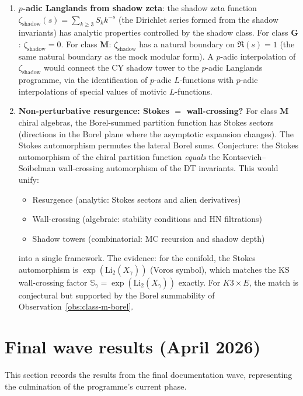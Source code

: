 \documentclass[11pt]{article}
\begin{document}
\begin{enumerate}[label=\textup{(\arabic*)}]
 \item \textbf{$p$-adic Langlands from shadow zeta}: the shadow
 zeta function $\zeta_{\mathrm{shadow}}(s) = \sum_{k \geq 3} S_k k^{-s}$
 (the Dirichlet series formed from the shadow invariants) has
 analytic properties controlled by the shadow class. For class
 $\mathbf{G}$: $\zeta_{\mathrm{shadow}} = 0$. For class $\mathbf{M}$:
 $\zeta_{\mathrm{shadow}}$ has a natural boundary on $\Re(s) = 1$
 (the same natural boundary as the mock modular form).
 A $p$-adic interpolation of $\zeta_{\mathrm{shadow}}$ would connect
 the CY shadow tower to the $p$-adic Langlands programme, via the
 identification of $p$-adic $L$-functions with $p$-adic interpolations
 of special values of motivic $L$-functions.

 \item \textbf{Non-perturbative resurgence: Stokes $=$ wall-crossing?}
 For class $\mathbf{M}$ chiral algebras, the Borel-summed partition
 function has Stokes sectors (directions in the Borel plane where the
 asymptotic expansion changes). The Stokes automorphism permutes the
 lateral Borel sums. Conjecture: the Stokes automorphism of the chiral
 partition function \emph{equals} the Kontsevich--Soibelman
 wall-crossing automorphism of the DT invariants. This would unify:
 \begin{itemize}
  \item Resurgence (analytic: Stokes sectors and alien derivatives)
  \item Wall-crossing (algebraic: stability conditions and HN filtrations)
  \item Shadow towers (combinatorial: MC recursion and shadow depth)
 \end{itemize}
 into a single framework. The evidence: for the conifold, the Stokes
 automorphism is $\exp(\mathrm{Li}_2(X_\gamma))$ (Voros symbol),
 which matches the KS wall-crossing factor
 $\mathbb{S}_\gamma = \exp(\mathrm{Li}_2(X_\gamma))$ exactly. For
 $K3 \times E$, the match is conjectural but supported by the
 Borel summability of Observation~\ref{obs:class-m-borel}.
\end{enumerate}

\section{Final wave results (April 2026)}
\label{sec:final-wave}

This section records the results from the final documentation wave,
representing the culmination of the programme's current phase.
\end{document}
